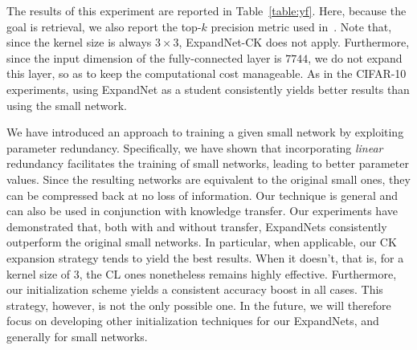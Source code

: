 \documentclass[10pt,twocolumn,letterpaper]{article}
\begin{document}
The results of this experiment are reported in Table~\ref{table:yf}. Here, because the goal is retrieval, we also report the top-$k$ precision metric used in~\cite{pkt_eccv}.  Note that, since the kernel size is always $3\times 3$, ExpandNet-CK does not apply. Furthermore, since the input dimension of the fully-connected layer is $7744$, we do not expand this layer, so as to keep the computational cost manageable. As in the CIFAR-10 experiments, using ExpandNet as a student consistently yields better results than using the small network.


We have introduced an approach to training a given small network by exploiting parameter redundancy. Specifically, we have shown that incorporating {\it linear} redundancy facilitates the training of small networks, leading to better parameter values. Since the resulting networks are equivalent to the original small ones, they can be compressed back at no loss of information. Our technique is general and can also be used in conjunction with knowledge transfer. Our experiments have demonstrated that, both with and without transfer, ExpandNets consistently outperform the original small networks. In particular, when applicable, our CK expansion strategy tends to yield the best results. When it doesn't, that is, for a kernel size of 3, the CL ones nonetheless remains highly effective. Furthermore, our initialization scheme yields a consistent accuracy boost in all cases. This strategy, however, is not the only possible one.
In the future, we will therefore focus on developing other initialization techniques for our ExpandNets, and generally for small networks.
\thispagestyle{empty}



{\small

}
\end{document}
